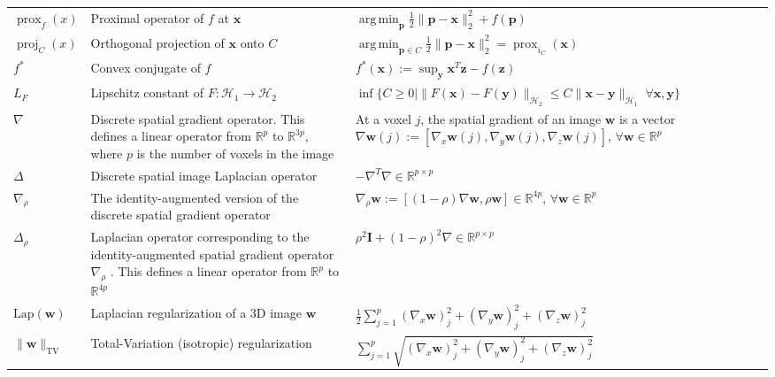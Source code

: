 \documentclass[nobib, a4paper, notoc, twoside, justified, openany]{tufte-book}
\DeclareMathOperator*{\argmin}{arg\,min}
\providecommand{\B}[1]{\mathbf{#1}}
\DeclareMathOperator{\proj}{proj}
\DeclareMathOperator{\prox}{prox}
\def\y{\mathbf{y}}
\def\I{\mathbf{I}}
\def\x{\mathbf{x}}
\def\w{\mathbf{w}}
\begin{document}
\begin{fullwidth}
\begin{longtable}{p{3cm} | p{6cm} | p{7.5cm}}
  $\prox_f(x)$ & Proximal operator of $f$ at $\B{x}$ & $\argmin_{\B{p}}\frac{1}{2}\|\B{p}-\B{x}\|_2^2 + f(\B{p})$\\

  $\proj_C(x)$ & Orthogonal projection of $\B{x}$ onto $C$ & $\argmin_{\B{p} \in C}\frac{1}{2}\|\B{p}-\B{x}\|_2^2 = \prox_{i_C}(\B{x})$\\
  $f^*$ & Convex conjugate of $f$ & $f^*(\B{x}) := \sup_{\B{y}}\B{x}^T\B{z} - f(\B{z})$\\
  $L_F$ & Lipschitz constant of $F: \mathcal H_1 \rightarrow \mathcal H_2$ & $\inf\{C \ge 0 | \|F(\x) - F(\y)\|_{\mathcal H_2} \le C\|\x - \y\|_{\mathcal H_1}\;\forall \x,\y\}$ \\
  \midrule

  $\nabla$ & Discrete spatial gradient operator. This defines a linear operator from $\mathbb R^p$ to $\mathbb R^{3p}$, where $p$ is the number of voxels in the image & At a voxel $j$, the spatial gradient of an image $\B{w}$ is a vector ${\nabla} {\w}(j) := [\nabla_{x} {\w}(j), \nabla_{y} {\w}(j), \nabla_{z} {\w}(j)]$, $\forall \w \in \mathbb R^p$ \\
  
  $\Delta$ & Discrete spatial image Laplacian operator & $-\nabla^T\nabla \in \mathbb R^{p \times p}$\\
  $\nabla_\rho$ & The identity-augmented version of the discrete spatial gradient operator & ${\nabla_\rho} {\w} := [(1-\rho)\nabla {\w}, \rho \w] \in \mathbb R^{4p}$, $\forall \w \in \mathbb R^p$ \\
  $\Delta_\rho$ & Laplacian operator corresponding to the identity-augmented spatial gradient operator $\nabla_\rho$ . This defines a linear operator from $\mathbb R^p$ to $\mathbb R^{4p}$ & $\rho^2\I + (1-\rho)^2\nabla \in \mathbb R^{p \times p}$ \\
  
  $\text{Lap}(\B{w})$ & Laplacian regularization of a 3D image $\B{w}$ & $\frac{1}{2}\sum_{j=1}^p(\nabla_x \B{w})_j^2 + (\nabla_y \B{w})_j^2 + (\nabla_z \B{w})_j^2$ \\ %
  $\|\B{w}\|_{\text{TV}}$ & Total-Variation (isotropic) regularization & $\sum_{j=1}^p\sqrt{(\nabla_x \B{w})_j^2 + (\nabla_y \B{w})_j^2 + (\nabla_z \B{w})_j^2}$\\
  

  
\bottomrule
\end{longtable}
\end{fullwidth}
\end{document}

